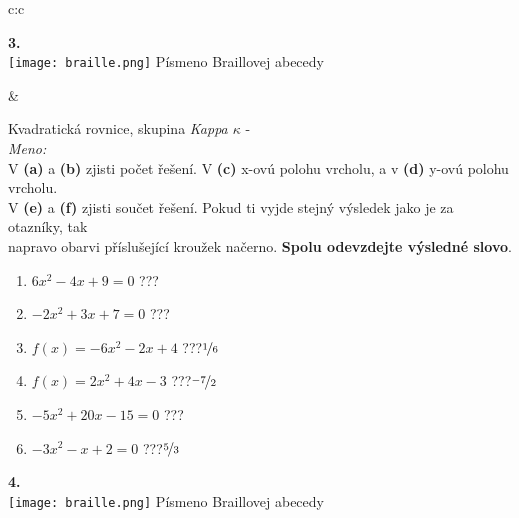 \documentclass[10pt]{report}
\begin{document}
\begin{tabular}{c:c}
\begin{minipage}[c][99mm][t]{0.49\linewidth}
\begin{center}
\begin{minipage}{0.20\linewidth}
\begin{center}
{\Huge\bfseries 3.} \\[2mm]
\texttt{[image: braille.png]}
{\small Písmeno Braillovej abecedy}
\end{center}
\end{minipage}
\end{center}
\end{minipage}
&
\begin{minipage}[c][99mm][t]{0.49\linewidth}
\begin{center}
\vspace{7mm}
{\huge Kvadratická rovnice, skupina \textit{Kappa $\kappa$} -}\\[4.5mm]
\textit{Meno:}\phantom{xxxxxxxxxxxxxxxxxxxxxxxxxxxxxxxxxxxxxxxxxxxxxxxxxxxxxxxxxxxxxxxxx}\\[3.5mm]
V \textbf{(a)} a \textbf{(b)} zjisti počet řešení. V \textbf{(c)} x-ovú polohu vrcholu, a v \textbf{(d)} y-ovú polohu vrcholu.\\V \textbf{(e)} a \textbf{(f)} zjisti součet řešení. Pokud ti vyjde stejný výsledek jako je za otazníky, tak\\napravo obarvi příslušející kroužek načerno. \textbf{Spolu odevzdejte výsledné slovo}.\\[3mm]
\begin{minipage}{0.77\linewidth}
\begin{center}
\begin{varwidth}{\textwidth}
\begin{enumerate}
\large
\item $6x^2-4x+9=0$\quad \dotfill\; ???\;\dotfill {}
\item $-2x^2+3x+7=0$\quad \dotfill\; ???\;\dotfill {}
\item $f(x)=-6x^2-2x+4$\quad \dotfill\; ???\;\dotfill \quad $\nicefrac{1}{6}$
\item $f(x)=2x^2+4x-3$\quad \dotfill\; ???\;\dotfill \quad $\nicefrac{-7}{2}$
\item $-5x^2+20x-15=0$\quad \dotfill\; ???\;\dotfill {}
\item $-3x^2-x+2=0$\quad \dotfill\; ???\;\dotfill \quad $\nicefrac{5}{3}$
\end{enumerate}
\end{varwidth}
\end{center}
\end{minipage}
\begin{minipage}{0.20\linewidth}
\begin{center}
{\Huge\bfseries 4.} \\[2mm]
\texttt{[image: braille.png]}
{\small Písmeno Braillovej abecedy}
\end{center}
\end{minipage}
\end{center}
\end{minipage}

\end{tabular}
\end{document}
